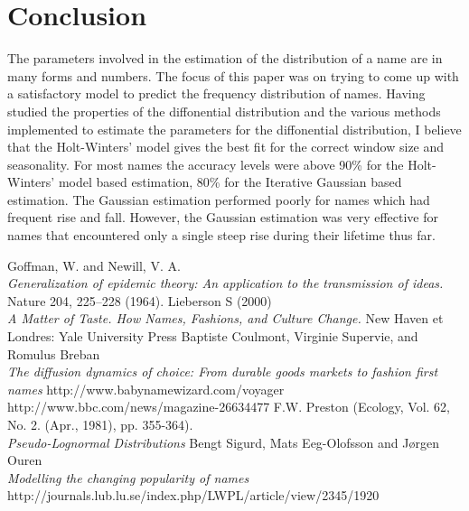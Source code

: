 \documentclass[letterpaper,12pt]{article}
\begin{document}
\section{Conclusion}
The parameters involved in the estimation of the distribution of a name are in many forms and numbers. The focus of this paper was on trying to come up with a satisfactory model to predict the frequency distribution of names. Having studied the properties of the diffonential distribution and the various methods implemented to estimate the parameters for the diffonential distribution, I believe that the Holt-Winters' model gives the best fit for the correct window size and seasonality. For most names the accuracy levels were above 90\% for the Holt-Winters' model based estimation, 80\% for the Iterative Gaussian based estimation. The Gaussian estimation performed poorly for names which had frequent rise and fall. However, the Gaussian estimation was very effective for names that encountered only a single steep rise during their lifetime thus far.  


\begin{thebibliography}{9}

Goffman, W. and Newill, V. A. \\
\textit{Generalization of epidemic theory: An application to the transmission of ideas.} Nature 204, 225–228 (1964).
Lieberson S (2000) \\
\textit{A Matter of Taste. How Names, Fashions, and Culture Change.}
New Haven et Londres: Yale University Press
Baptiste Coulmont, Virginie Supervie, and Romulus Breban\\
\textit{The diffusion dynamics of choice: From durable goods markets to fashion first names}
http://www.babynamewizard.com/voyager
http://www.bbc.com/news/magazine-26634477
F.W. Preston  (Ecology, Vol. 62, No. 2. (Apr., 1981), pp. 355-364).\\
\textit{Pseudo-Lognormal Distributions}
Bengt Sigurd, Mats Eeg-Olofsson and Jørgen Ouren\\
\textit{Modelling the changing popularity of names}\\
http://journals.lub.lu.se/index.php/LWPL/article/view/2345/1920
\end{thebibliography}
\end{document}
